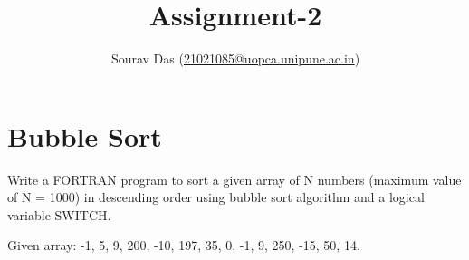 \documentclass[11pt]{article} %
\title{Assignment-2}
\author{Sourav Das (\url{21021085@uopca.unipune.ac.in})}
\date{} %
\begin{document}
\maketitle

\section{Bubble Sort}
Write a FORTRAN program to sort a given array of N numbers (maximum value of N = 1000) in descending order using bubble sort algorithm and a logical variable SWITCH.

\noindent Given array:  -1, 5, 9, 200, -10, 197, 35, 0, -1, 9, 250, -15, 50, 14.
\end{document}
